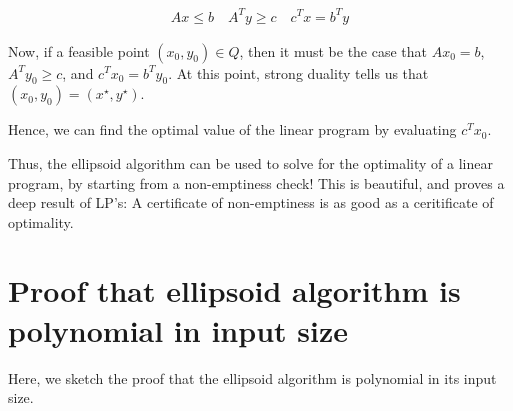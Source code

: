 \documentclass[conference]{IEEEtran}
\begin{document}
\begin{align*}
        A x \leq b \quad
        A^T y \geq c \quad
        c^Tx = b^T y
\end{align*}

Now, if a feasible point $(x_0, y_0) \in Q$, then it must be the case that $Ax_0 = b$,
$A^Ty_0 \geq c$, and $c^Tx_0 = b^Ty_0$. At this point, strong duality tells us that
$(x_0, y_0) = (x^\star, y^\star)$. 

Hence, we can find the optimal value of the linear program by evaluating $c^T x_0$.


Thus, the ellipsoid algorithm can be used to solve for the optimality of a linear
program, by starting from a non-emptiness check! This is beautiful, and proves
a deep result of LP's: A certificate of non-emptiness is as good as a ceritificate
of optimality.

\section{Proof that ellipsoid algorithm is polynomial in input size}
Here, we sketch the proof that the ellipsoid algorithm is polynomial
in its input size.





\end{document}
